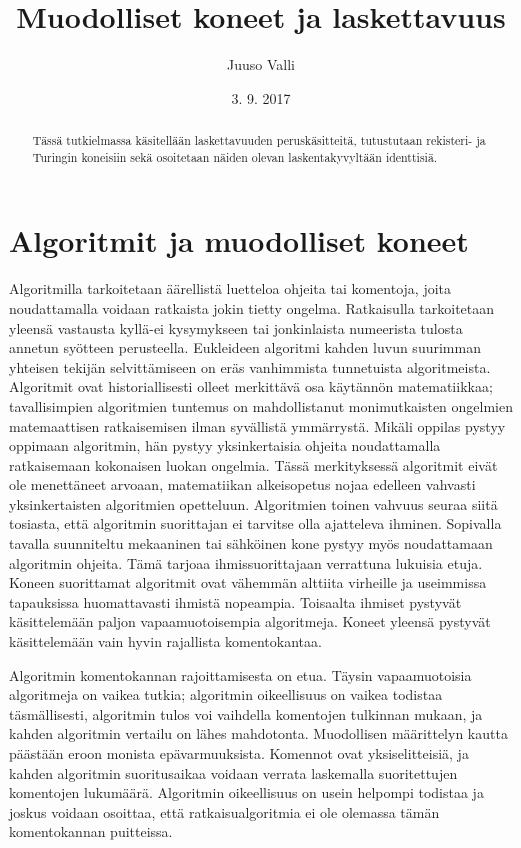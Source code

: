 \documentclass[a4paper, 12pt]{article}
\theoremstyle{definition}
\theoremstyle{plain}
\begin{document}
\title{Muodolliset koneet ja laskettavuus}
\author{Juuso Valli}
\date{3. 9. 2017}

\maketitle

\begin{abstract}
Tässä tutkielmassa käsitellään laskettavuuden peruskäsitteitä, 
tutustutaan rekisteri- ja Turingin koneisiin 
sekä osoitetaan näiden olevan laskentakyvyltään identtisiä.
\end{abstract}

\tableofcontents

\newpage

\section{Algoritmit ja muodolliset koneet}
Algoritmilla tarkoitetaan äärellistä luetteloa ohjeita tai komentoja, joita noudattamalla voidaan ratkaista jokin tietty ongelma. Ratkaisulla tarkoitetaan yleensä vastausta kyllä-ei kysymykseen tai jonkinlaista numeerista tulosta annetun syötteen perusteella. Eukleideen algoritmi kahden luvun suurimman yhteisen tekijän selvittämiseen on eräs vanhimmista tunnetuista algoritmeista. Algoritmit ovat historiallisesti olleet merkittävä osa käytännön matematiikkaa; tavallisimpien algoritmien tuntemus on mahdollistanut monimutkaisten ongelmien matemaattisen ratkaisemisen ilman syvällistä ymmärrystä. Mikäli oppilas pystyy oppimaan algoritmin, hän pystyy yksinkertaisia ohjeita noudattamalla ratkaisemaan kokonaisen luokan ongelmia. Tässä merkityksessä algoritmit eivät ole menettäneet arvoaan, matematiikan alkeisopetus nojaa edelleen vahvasti yksinkertaisten algoritmien opetteluun. Algoritmien toinen vahvuus seuraa siitä tosiasta, että algoritmin suorittajan ei tarvitse olla ajatteleva ihminen. Sopivalla tavalla suunniteltu mekaaninen tai sähköinen kone pystyy myös noudattamaan algoritmin ohjeita. Tämä tarjoaa ihmissuorittajaan verrattuna lukuisia etuja. Koneen suorittamat algoritmit ovat vähemmän alttiita virheille ja useimmissa tapauksissa huomattavasti ihmistä nopeampia. Toisaalta ihmiset pystyvät käsittelemään paljon vapaamuotoisempia algoritmeja. Koneet yleensä pystyvät käsittelemään vain hyvin rajallista komentokantaa. 

Algoritmin komentokannan rajoittamisesta on etua. Täysin vapaamuotoisia algoritmeja on vaikea tutkia; algoritmin oikeellisuus on vaikea todistaa täsmällisesti, algoritmin tulos voi vaihdella komentojen tulkinnan mukaan, ja kahden algoritmin vertailu on lähes mahdotonta. Muodollisen määrittelyn kautta päästään eroon monista epävarmuuksista. Komennot ovat yksiselitteisiä, ja kahden algoritmin suoritusaikaa voidaan verrata laskemalla suoritettujen komentojen lukumäärä. Algoritmin oikeellisuus on usein helpompi todistaa ja joskus voidaan osoittaa, että ratkaisualgoritmia ei ole olemassa tämän komentokannan puitteissa.
\end{document}
